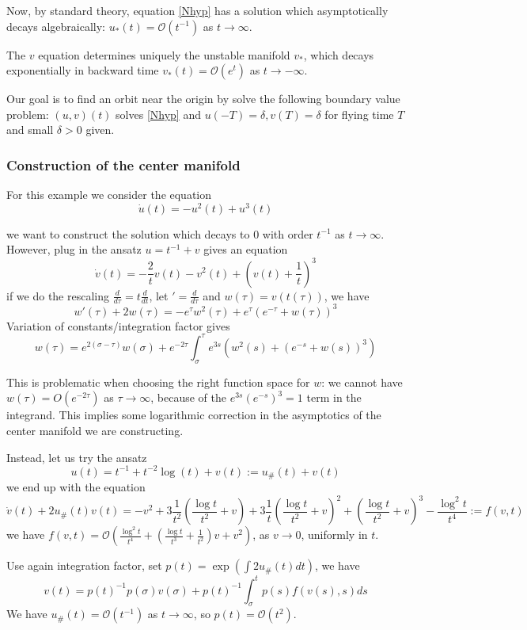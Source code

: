 \documentclass[letterpaper,11pt]{article}
\newcommand{\rmO}{\mathcal{O}}
\numberwithin{equation}{section}
\theoremstyle{plain}
\begin{document}
Now, by standard theory, equation \eqref{Nhyp} has a solution which  asymptotically decays algebraically: $u_*(t) = \rmO(t^{-1})$ as $t\to \infty$. 

The $v$ equation determines uniquely the unstable manifold $v_*$, which decays exponentially in backward time $v_*(t) = \rmO(e^t)$ as $t\to -\infty$.


Our goal is to find an orbit near the origin by solve the following boundary value problem: $(u,v)(t)$ solves \eqref{Nhyp} and $u(-T) = \delta, v(T) = \delta$ for flying time $T$ and small $\delta>0$ given.


\subsubsection{Construction of the center manifold}
For this example we consider the equation 
\[
\dot{u} (t)= -u^2(t) + u^3(t)
\]

we want to construct the solution which decays to $0$ with order $t^{-1}$ as $t \to \infty$. However, plug in the ansatz $u = t^{-1} +v$ gives an equation
\[
\dot{v}(t) = -\frac{2}{t} v(t) -v^2(t)+(v(t)+\frac{1}{t})^3
\]
if we do the rescaling $\frac{d}{d\tau} = t\frac{d}{dt}$, let $' = \frac{d}{d\tau}$ and $w(\tau)=v(t(\tau))$, we have
\[
w'(\tau)+2w(\tau) =- e^\tau w^2(\tau) +e^\tau(e^{-\tau}+w(\tau))^3
\]
Variation of constants/integration factor gives
\[
w(\tau) = e^{2(\sigma-\tau)}w(\sigma)+e^{-2\tau}\int_{\sigma}^{\tau} e^{3s}(w^2(s)+(e^{-s}+w(s))^3)
\]

This is problematic when choosing the right function space for $w$: we cannot have $w(\tau) = O(e^{-2\tau})$ as $\tau \to \infty$, because of the $e^{3s}(e^{-s})^3 = 1$ term in the integrand. This implies some logarithmic correction in the asymptotics of the center manifold we are constructing.


Instead, let us try the ansatz
\[
u(t)=t^{-1}+t^{-2}\log(t) +v(t) := u_\#(t)+v(t)
\]
we end up with the equation 
\[
\dot{v}(t)+2u_\#(t)v(t) = -v^2+3\frac{1}{t^2}(\frac{\log t}{t^2}+v)+3\frac{1}{t}(\frac{\log t}{t^2}+v)^2+(\frac{\log t}{t^2}+v)^3 -\frac{\log^2 t}{t^4} := f(v,t)
\]
 we have $f(v,t) = \rmO(\frac{\log^2 t}{t^4}+(\frac{\log t}{t^3}+\frac{1}{t^2}) v+v^2)$, as $v\to 0$, uniformly in $t$.

Use again integration factor, set $p(t) = \exp(\int 2u_\#(t)dt)$, we have
\[
v(t)=p(t)^{-1}p(\sigma) v(\sigma)+p(t)^{-1}\int_\sigma^t p(s)f(v(s),s)ds
\]
We have $u_\#(t) = \rmO(t^{-1})$ as $t \to \infty$, so $p(t) = \rmO(t^2)$.
\end{document}
